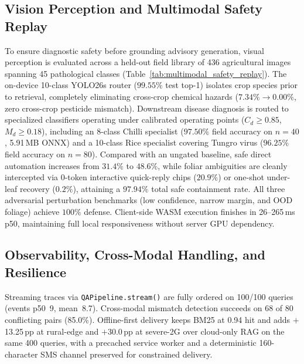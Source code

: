 \subsection{Vision Perception and Multimodal Safety Replay}
To ensure diagnostic safety before grounding advisory generation, visual perception is evaluated across a held-out field library of 436 agricultural images spanning 45 pathological classes (Table~\ref{tab:multimodal_safety_replay}). The on-device 10-class YOLO26s router ($99.55\%$ test top-1) isolates crop species prior to retrieval, completely eliminating cross-crop chemical hazards ($7.34\% \rightarrow \mathbf{0.00\%}$, zero cross-crop pesticide mismatch). Downstream disease diagnosis is routed to specialized classifiers operating under calibrated operating points ($C_d \ge 0.85$, $M_d \ge 0.18$), including an 8-class Chilli specialist ($97.50\%$ field accuracy on $n=40$, 5.91\,MB ONNX) and a 10-class Rice specialist covering Tungro virus ($96.25\%$ field accuracy on $n=80$). Compared with an ungated baseline, safe direct automation increases from $31.4\%$ to $\mathbf{48.6\%}$, while foliar ambiguities are cleanly intercepted via 0-token interactive quick-reply chips ($20.9\%$) or one-shot under-leaf recovery ($0.2\%$), attaining a $\mathbf{97.94\%}$ total safe containment rate. All three adversarial perturbation benchmarks (low confidence, narrow margin, and OOD foliage) achieve $100\%$ defense. Client-side WASM execution finishes in 26--265\,ms p50, maintaining full local responsiveness without server GPU dependency.



\subsection{Observability, Cross-Modal Handling, and Resilience}
Streaming traces via \texttt{QAPipeline.stream()} are fully ordered on 100/100 queries (events p50~9, mean~8.7). Cross-modal mismatch detection succeeds on 68 of 80 conflicting pairs (85.0\%). Offline-first delivery keeps BM25 at 0.94 hit and adds $+$13.25\,pp at rural-edge and $+$30.0\,pp at severe-2G over cloud-only RAG on the same 400 queries, with a precached service worker and a deterministic 160-character SMS channel preserved for constrained delivery.

